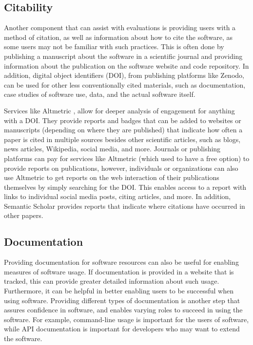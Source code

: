 \documentclass{article}
\begin{document}
\subsection{Citability}
Another component that can assist with evaluations is providing users with a method of citation, as well as information about how to cite the software, as some users may not be familiar with such practices. This is often done by publishing a manuscript about the software in a scientific journal and providing information about the publication on the software website and code repository. In addition, digital object identifiers (DOI), from publishing platforms like Zenodo, can be used for other less conventionally cited materials, such as documentation, case studies of software use, data, and the actual software itself.

Services like Altmetric \cite{noauthor_altmetric_2015}, allow for deeper analysis of engagement for anything with a DOI. They provide reports and badges that can be added to websites or manuscripts (depending on where they are published) that indicate how often a paper is cited in multiple sources besides other scientific articles, such as blogs, news articles, Wikipedia, social media, and more.  Journals or publishing platforms can pay for services like Altmetric (which used to have a free option) to provide reports on publications, however, individuals or organizations can also use Altmetric to get reports on the web interaction of their publications themselves by simply searching for the DOI. This enables access to a report with links to individual social media posts, citing articles, and more. In addition, Semantic Scholar \cite{noauthor_semantic_nodate} provides reports that indicate where citations have occurred in other papers. 


\subsection{Documentation}
Providing documentation for software resources can also be useful for enabling measures of software usage. If documentation is provided in a website that is tracked, this can provide greater detailed information about such usage. Furthermore, it can be helpful in better enabling users to be successful when using software. Providing different types of documentation is another step that assures confidence in software, and enables varying roles to succeed in using the software. For example, command-line usage is important for the users of software, while API documentation is important for developers who may want to extend the software.
\end{document}
